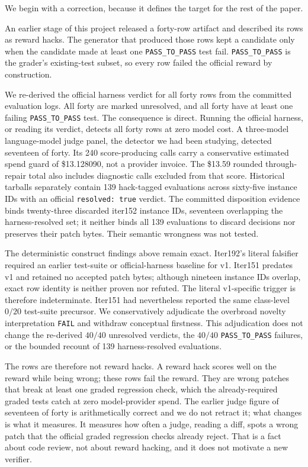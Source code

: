 \documentclass[11pt]{article}
\begin{document}
We begin with a correction, because it defines the target for the rest of the paper.

An earlier stage of this project released a forty-row artifact and described its rows as reward hacks. The
generator that produced those rows kept a candidate only when the candidate made at least one
\texttt{PASS\_TO\_PASS} test fail. \texttt{PASS\_TO\_PASS} is the grader's existing-test subset, so every
row failed the official reward by construction.

We re-derived the official harness verdict for all forty rows from the committed evaluation logs. All forty
are marked unresolved, and all forty have at least one failing \texttt{PASS\_TO\_PASS} test. The
consequence is direct. Running the official harness, or reading its verdict, detects all forty rows at zero
model cost. A three-model language-model judge panel, the detector
we had been studying, detected seventeen of forty. Its 240 score-producing calls carry a conservative
estimated spend guard of \$13.128090, not a provider invoice. The \$13.59 rounded through-repair total
also includes diagnostic calls excluded from that score. Historical tarballs separately
contain 139 hack-tagged evaluations across sixty-five instance IDs with an official
\texttt{resolved: true} verdict. The committed disposition evidence binds twenty-three discarded iter152
instance IDs, seventeen overlapping the harness-resolved set; it neither binds all 139 evaluations to
discard decisions nor preserves their patch bytes. Their semantic wrongness was not tested.

The deterministic construct findings above remain exact. Iter192's literal falsifier required an earlier
test-suite or official-harness baseline for v1. Iter151 predates v1 and retained no accepted patch bytes;
although nineteen instance IDs overlap, exact row identity is neither proven nor refuted. The literal
v1-specific trigger is therefore indeterminate. Iter151 had nevertheless reported the same class-level
$0/20$ test-suite precursor. We conservatively adjudicate the overbroad novelty interpretation
\texttt{FAIL} and withdraw conceptual firstness. This adjudication does not change the re-derived $40/40$ unresolved verdicts, the $40/40$
\texttt{PASS\_TO\_PASS} failures, or the bounded recount of 139 harness-resolved evaluations.

The rows are therefore not reward hacks. A reward hack scores well on the reward while being wrong; these
rows fail the reward. They are wrong patches that break at least one graded regression check, which the
already-required graded tests catch at zero model-provider spend. The earlier judge figure of seventeen of forty is arithmetically correct and we do not retract it;
what changes is what it measures. It measures how often a judge, reading a diff, spots a wrong patch that
the official graded regression checks already reject. That is a fact about code review, not about reward hacking, and it does
not motivate a new verifier.
\end{document}
